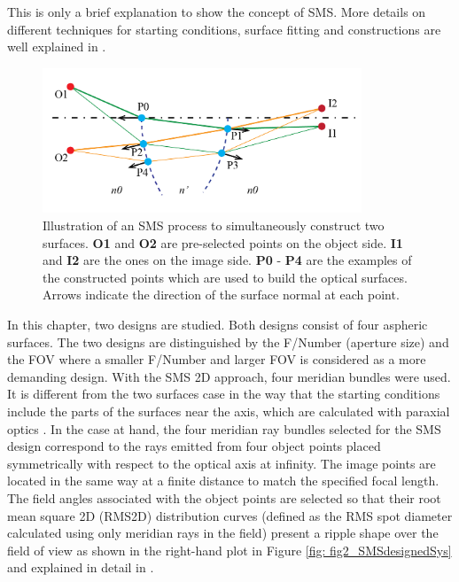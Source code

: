 This is only a brief explanation to show the concept of SMS. More details on different techniques for starting conditions, surface fitting and constructions are well explained in \cite{book:ChavesNonimagingOptics}.

\begin{figure}[h!]
    \centering
    \includegraphics[width=0.85\textwidth]{chapter-5/figures/Figure_sms_explain_2D.png}
    \caption{Illustration of an SMS process to simultaneously construct two surfaces. \textbf{O1} and \textbf{O2} are pre-selected points on the object side. \textbf{I1} and \textbf{I2} are the ones on the image side. \textbf{P0} - \textbf{P4} are the examples of the constructed points which are used to build the optical surfaces. Arrows indicate the direction of the surface normal at each point. }
    \label{fig: sms_2d_explain}
\end{figure}

In this chapter, two designs are studied. Both designs consist of four aspheric surfaces. The two designs are distinguished by the F/Number (aperture size) and the FOV where a smaller F/Number and larger FOV is considered as a more demanding design. With the SMS 2D approach, four meridian bundles were used. It is different from the two surfaces case in the way that the starting conditions include the parts of the surfaces near the axis, which are calculated with paraxial optics \cite{MinanoOE09}. In the case at hand, the four meridian ray bundles selected for the SMS design correspond to the rays emitted from four object points placed symmetrically with respect to the optical axis at infinity. The image points are located in the same way at a finite distance to match the specified focal length. The field angles associated with the object points are selected so that their root mean square 2D (RMS2D) distribution curves (defined as the RMS spot diameter calculated using only meridian rays in the field) present a ripple shape over the field of view as shown in the right-hand plot in Figure \ref{fig: fig2_SMSdesignedSys} and explained in detail in \cite{LinWang12OE}. 

